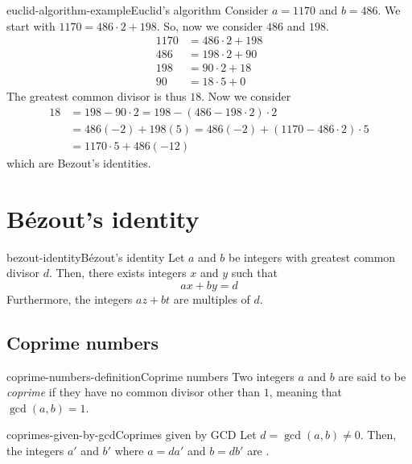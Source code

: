 \documentclass[preview]{standalone}
\begin{document}
\begin{snippetexample}{euclid-algorithm-example}{Euclid's algorithm}
    Consider \(a=1170\) and \(b=486\).
    We start with
    \(1170 = 486 \cdot 2 + 198\). So, now we consider \(486\) and \(198\).
    \begin{align*}
        1170 &= 486 \cdot 2 + 198 \\
        486 &= 198 \cdot 2 + 90 \\
        198 &= 90 \cdot 2 + 18 \\
        90 &= 18 \cdot 5 + 0
    \end{align*}
    The greatest common divisor is thus \(18\).
    Now we consider
    \begin{align*}
        18 &= 198 - 90\cdot 2 = 198 - (486 - 198 \cdot 2)\cdot 2 \\
        &= 486(-2) + 198(5) = 486(-2) + (1170 - 486\cdot 2) \cdot 5 \\
        &= 1170 \cdot 5 + 486(-12)
    \end{align*}
    which are Bezout's identities.
\end{snippetexample}

\section{Bézout's identity}

\begin{snippettheorem}{bezout-identity}{Bézout's identity}
    Let \(a\) and \(b\) be integers with greatest common divisor \(d\).
    Then, there exists integers \(x\) and \(y\) such that
    \[
        ax+by=d
    \]
    Furthermore, the integers \(az+bt\) are multiples of \(d\).
\end{snippettheorem}


\subsection{Coprime numbers}

\begin{snippetdefinition}{coprime-numbers-definition}{Coprime numbers}
    Two integers \(a\) and \(b\) are said to be \textit{coprime}
    if they have no common divisor other than \(1\), meaning that \(\gcd(a,b)=1\).
\end{snippetdefinition}

\begin{snippetproposition}{coprimes-given-by-gcd}{Coprimes given by GCD}
    Let \(d = \gcd(a, b) \neq 0\). Then, the integers \(a'\) and \(b'\) where \(a = da'\) and \(b = db'\)
    are \coprime.
\end{snippetproposition}
\end{document}
